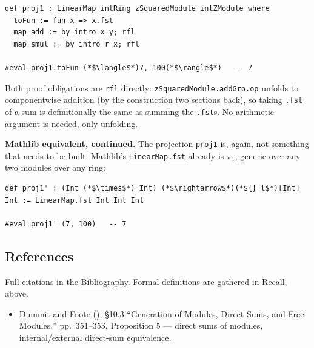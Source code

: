 \begin{lstlisting}
def proj1 : LinearMap intRing zSquaredModule intZModule where
  toFun := fun x => x.fst
  map_add := by intro x y; rfl
  map_smul := by intro r x; rfl

#eval proj1.toFun (*$\langle$*)7, 100(*$\rangle$*)   -- 7
\end{lstlisting}

Both proof obligations are \texttt{rfl} directly: \texttt{zSquaredModule.addGrp.op} unfolds to componentwise addition (by the construction two sections back), so taking \texttt{.fst} of a sum is definitionally the same as summing the \texttt{.fst}s. No arithmetic argument is needed, only unfolding.

\textbf{Mathlib equivalent, continued.} The projection \texttt{proj1} is, again, not something that needs to be built. Mathlib's \href{https://loogle.lean-lang.org/?q=LinearMap.fst}{\texttt{LinearMap.fst}} already is \(\pi_1\), generic over any two modules over any ring:

\begin{lstlisting}
def proj1' : (Int (*$\times$*) Int) (*$\rightarrow$*)(*${}_l$*)[Int] Int := LinearMap.fst Int Int Int

#eval proj1' (7, 100)   -- 7
\end{lstlisting}

\subsection{References}\label{sec:10-modules:06-direct-sums:4}

Full citations in the \hyperref[sec:root:bibliography:1]{Bibliography}. Formal definitions are gathered in Recall, above.

\begin{itemize}
\tightlist
\item
  Dummit and Foote (\cite{DummitFoote2003}), §10.3 ``Generation of Modules, Direct Sums, and Free Modules,'' pp.~351--353, Proposition 5 --- direct sums of modules, internal/external direct-sum equivalence.
\end{itemize}
